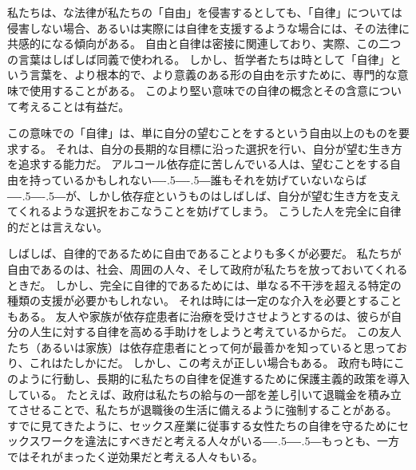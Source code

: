 \documentclass[paper=a4,book,openany]{jlreq}
\def\DDASH{―\kern-.5\zw―\kern-.5\zw―} %
\begin{document}
私たちは、な法律が私たちの「自由」を侵害するとしても、「自律」については侵害しない場合、あるいは実際には自律を支援するような場合には、その法律に共感的になる傾向がある。
自由と自律は密接に関連しており、実際、この二つの言葉はしばしば同義で使われる。
しかし、哲学者たちは時として「自律」という言葉を、より根本的で、より意義のある形の自由を示すために、専門的な意味で使用することがある。
このより堅い意味での自律の概念とその含意について考えることは有益だ。

この意味での「自律」は、単に自分の望むことをするという自由以上のものを要求する。
それは、自分の長期的な目標に沿った選択を行い、自分が望む生き方を追求する能力だ。
アルコール依存症に苦しんでいる人は、望むことをする自由を持っているかもしれない{\DDASH}誰もそれを妨げていないならば{\DDASH}が、しかし依存症というものはしばしば、自分が望む生き方を支えてくれるような選択をおこなうことを妨げてしまう。
こうした人を完全に自律的だとは言えない。

しばしば、自律的であるために自由であることよりも多くが必要だ。
私たちが自由であるのは、社会、周囲の人々、そして政府が私たちを放っておいてくれるときだ。
しかし、完全に自律的であるためには、単なる不干渉を超える特定の種類の支援が必要かもしれない。
それは時には一定のな介入を必要とすることもある。
友人や家族が依存症患者に治療を受けさせようとするのは、彼らが自分の人生に対する自律を高める手助けをしようと考えているからだ。
この友人たち（あるいは家族）は依存症患者にとって何が最善かを知っていると思っており、これはたしかにだ。
しかし、この考えが正しい場合もある。
政府も時にこのように行動し、長期的に私たちの自律を促進するために保護主義的政策を導入している。
たとえば、政府は私たちの給与の一部を差し引いて退職金を積み立てさせることで、私たちが退職後の生活に備えるように強制することがある。
すでに見てきたように、セックス産業に従事する女性たちの自律を守るためにセックスワークを違法にすべきだと考える人々がいる{\DDASH}もっとも、一方ではそれがまったく逆効果だと考える人々もいる。
\end{document}
